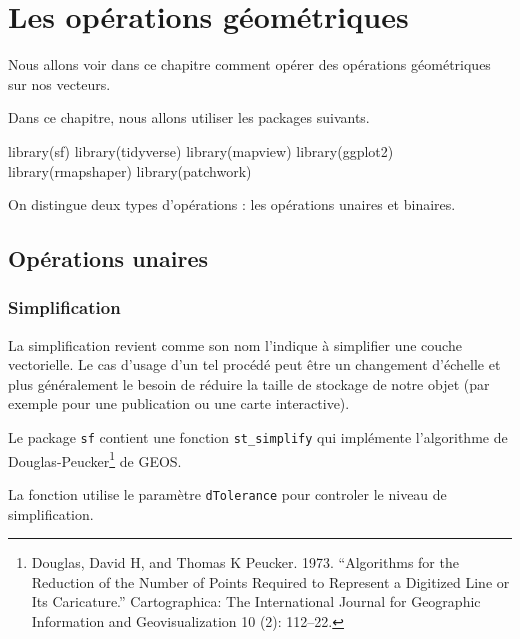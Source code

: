 \documentclass[
]{book}
\newenvironment{Shaded}{\begin{snugshade}}{\end{snugshade}}
\newcommand{\FunctionTok}[1]{\textcolor[rgb]{0.00,0.00,0.00}{#1}}
\newcommand{\NormalTok}[1]{#1}
\begin{document}
\hypertarget{les-opuxe9rations-guxe9omuxe9triques}{%
\chapter{Les opérations géométriques}\label{les-opuxe9rations-guxe9omuxe9triques}}

Nous allons voir dans ce chapitre comment opérer des opérations géométriques sur nos vecteurs.

Dans ce chapitre, nous allons utiliser les packages suivants.

\begin{Shaded}
\begin{Highlighting}[]
\FunctionTok{library}\NormalTok{(sf)}
\FunctionTok{library}\NormalTok{(tidyverse)}
\FunctionTok{library}\NormalTok{(mapview)}
\FunctionTok{library}\NormalTok{(ggplot2)}
\FunctionTok{library}\NormalTok{(rmapshaper)}
\FunctionTok{library}\NormalTok{(patchwork)}
\end{Highlighting}
\end{Shaded}

On distingue deux types d'opérations : les opérations unaires et binaires.

\hypertarget{opuxe9rations-unaires}{%
\section{Opérations unaires}\label{opuxe9rations-unaires}}

\hypertarget{simplification}{%
\subsection{Simplification}\label{simplification}}

La simplification revient comme son nom l'indique à simplifier une couche vectorielle. Le cas d'usage d'un tel procédé peut être un changement d'échelle et plus généralement le besoin de réduire la taille de stockage de notre objet (par exemple pour une publication ou une carte interactive).

Le package \texttt{sf} contient une fonction \texttt{st\_simplify} qui implémente l'algorithme de Douglas-Peucker\footnote{Douglas, David H, and Thomas K Peucker. 1973. ``Algorithms for the Reduction of the Number of Points Required to Represent a Digitized Line or Its Caricature.'' Cartographica: The International Journal for Geographic Information and Geovisualization 10 (2): 112--22.} de GEOS.

La fonction utilise le paramètre \texttt{dTolerance} pour controler le niveau de simplification.
\end{document}
